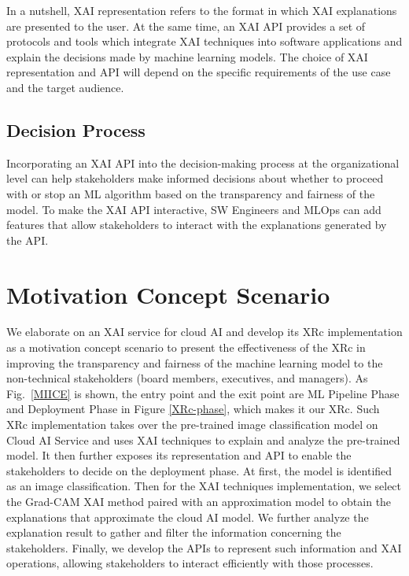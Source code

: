 \documentclass[conference]{IEEEtran}
\begin{document}
In a nutshell, XAI representation refers to the format in which XAI explanations are presented to the user. At the same time, an XAI API provides a set of protocols and tools which integrate XAI techniques into software applications and explain the decisions made by machine learning models. The choice of XAI representation and API will depend on the specific requirements of the use case and the target audience.

\subsection{Decision Process}
Incorporating an XAI API into the decision-making process at the organizational level can help stakeholders make informed decisions about whether to proceed with or stop an ML algorithm based on the transparency and fairness of the model. To make the XAI API interactive, SW Engineers and MLOps can add features that allow stakeholders to interact with the explanations generated by the API.

\section{Motivation Concept Scenario}

We elaborate on an XAI service for cloud AI and develop its XRc implementation as a motivation concept scenario to present the effectiveness of the XRc in improving the transparency and fairness of the machine learning model to the non-technical stakeholders (board members, executives, and managers).
As Fig.~\ref{MIICE} is shown, the entry point and the exit point are ML Pipeline Phase and Deployment Phase in Figure \ref{XRc-phase}, which makes it our XRc. Such XRc implementation takes over the pre-trained image classification model on Cloud AI Service and uses XAI techniques to explain and analyze the pre-trained model. It then further exposes its representation and API to enable the stakeholders to decide on the deployment phase. At first, the model is identified as an image classification. Then for the XAI techniques implementation, we select the Grad-CAM XAI method paired with an approximation model to obtain the explanations that approximate the cloud AI model. We further analyze the explanation result to gather and filter the information concerning the stakeholders. Finally, we develop the APIs to represent such information and XAI operations, allowing stakeholders to interact efficiently with those processes.
\end{document}
